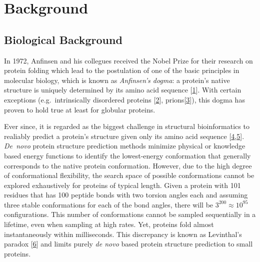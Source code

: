 \documentclass[11pt,a4paper,twoside]{book}
\theoremstyle{definition}
\theoremstyle{definition}
\theoremstyle{remark}
\begin{document}
\tableofcontents
{}

\mainmatter \setcounter{page}{1}

\chapter{Background}\label{background}

\section{Biological Background}\label{general-intro}

In 1972, Anfinsen and his collegues received the Nobel Prize for their
research on protein folding which lead to the postulation of one of the
basic principles in molecular biology, which is known as
\emph{Anfinsen's dogma}: a protein's native structure is uniquely
determined by its amino acid sequence
{[}\protect\hyperlink{ref-Anfinsen1973}{1}{]}. With certain exceptions
(e.g.~intrinsically disordered proteins
{[}\protect\hyperlink{ref-Wright1999}{2}{]},
prions{[}\protect\hyperlink{ref-Fraser2014}{3}{]}), this dogma has
proven to hold true at least for globular proteins.

Ever since, it is regarded as the biggest challenge in structural
bioinformatics to realiably predict a protein's structure given only its
amino acid sequence
{[}\protect\hyperlink{ref-Samish2015}{4},\protect\hyperlink{ref-Schwede2013}{5}{]}.
\emph{De~novo} protein structure prediction methods minimize physical or
knowledge based energy functions to identify the lowest-energy
conformation that generally corresponds to the native protein
conformation. However, due to the high degree of conformational
flexibility, the search space of possible conformations cannot be
explored exhaustively for proteins of typical length. Given a protein
with 101 residues that has 100 peptide bonds with two torsion angles
each and assuming three stable conformations for each of the bond
angles, there will be \(3^200 \approx 10^{95}\) configurations. This
number of conformations cannot be sampled sequentially in a lifetime,
even when sampling at high rates. Yet, proteins fold almost
instantaneously within milliseconds. This discrepancy is known as
Levinthal's paradox {[}\protect\hyperlink{ref-Levinthal1969}{6}{]} and
limits purely \emph{de novo} based protein structure prediction to small
proteins.
\end{document}
